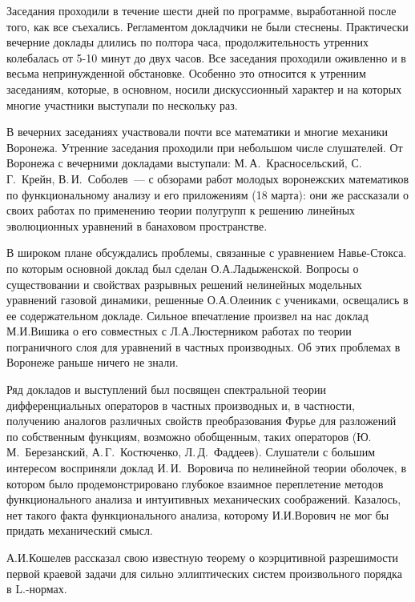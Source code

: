 Заседания проходили в течение шести дней по программе, выработанной после того, как все съехались.
Регламентом докладчики не были стеснены.
Практически вечерние доклады длились по полтора часа,
продолжительность
\linebreak
утренних колебалась от 5-10 минут до двух часов.
Все заседания проходили оживленно и в весьма непринужденной обстановке. Особенно это относится к утренним заседаниям, которые, в основном, носили дискуссионный характер и на которых многие участники выступали по нескольку раз.

В вечерних заседаниях участвовали почти все математики и многие механики Воронежа.
Утренние заседания проходили при небольшом числе слушателей.
От Воронежа с вечерними докладами выступали:
М.\,А.~Красносельский,
\linebreak
С.\,Г.~Крейн, В.\,И.~Соболев~--- с обзорами работ молодых воронежских математиков по функциональному анализу и его приложениям (18 марта): они же рассказали о своих работах по применению теории полугрупп к решению линейных эволюционных уравнений в банаховом пространстве.

В широком плане обсуждались проблемы, связанные с уравнением Навье-Стокса. по которым основной доклад был сделан О.А.Ладыженской. Вопросы о существовании и свойствах разрывных решений нелинейных модельных уравнений газовой динамики, решенные О.А.Олеиник с учениками, освещались в ее содержательном докладе. Сильное впечатление произвел на нас доклад М.И.Вишика о его совместных с Л.А.Люстерником работах по теории пограничного слоя для уравнений в частных производных. Об этих проблемах в Воронеже раньше ничего не знали.

Ряд докладов и выступлений был посвящен спектральной теории дифференциальных операторов в частных производных и,
в частности, получению аналогов различных свойств преобразования Фурье для разложений по собственным функциям,
возможно обобщенным, таких операторов
(Ю.\,М.~Березанский, А.\,Г.~Костюченко, Л.\,Д.~Фаддеев).
Слушатели с большим интересом восприняли доклад И.\,И.~Воровича по нелинейной теории оболочек,
в котором было продемонстрировано глубокое взаимное переплетение методов функционального анализа и интуитивных механических соображений. Казалось, нет такого факта функционального анализа, которому И.И.Ворович не мог бы придать механический смысл.

А.И.Кошелев рассказал свою известную теорему о коэрцитивной разрешимости первой краевой задачи для сильно эллиптических систем произвольного порядка в L.-нормах.

